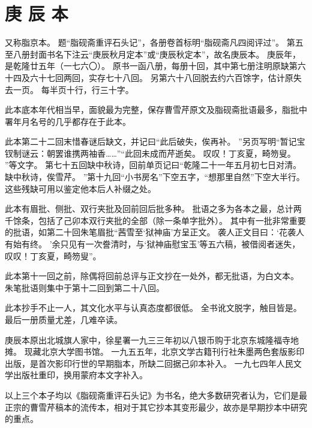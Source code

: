 \section*{庚 辰 本}
又称脂京本。
题“脂砚斋重评石头记”，各册卷首标明“脂砚斋凡四阅评过”。
第五至八册封面书名下注云“庚辰秋月定本”或“庚辰秋定本”，故名庚辰本。
庚辰年，是乾隆廿五年（一七六〇）。
原书一函八册，每册十回，其中第七册注明原缺第六十四及六十七回两回，实存七十八回。
另第六十八回脱去约六百馀字，估计原失去一页。
每半页十行，行三十字。
\par
此本底本年代相当早，面貌最为完整，保存曹雪芹原文及脂砚斋批语最多，脂批中署年月名号的几乎都存在于此本。
\par
此本第二十二回末惜春谜后缺文，并记曰“此后破失，俟再补。
”另页写明“暂记宝钗制谜云：朝罢谁携两袖香……”“此回未成而芹逝矣。
叹叹！丁亥夏，畸笏叟。
”等文字。
第七十五回缺中秋诗，回前单页记曰“乾隆二十一年五月初七日对清。
缺中秋诗，俟雪芹。
”第十九回“小书房名”下空五字，“想那里自然”下空大半行。
这些残缺可用以鉴定他本后人补缀之处。
\par
此本有眉批、侧批、双行夹批及回前回后批多种。
批语之多为各本之最，总计两千馀条，包括了己卯本双行夹批的全部（除一条单字批外）。
其中有一批非常重要的批语，如第二十回朱笔眉批“茜雪至‘狱神庙’方呈正文。
袭人正文目曰：‘花袭人有始有终。
’余只见有一次誊清时，与‘狱神庙慰宝玉’等五六稿，被借阅者迷失，叹叹！丁亥夏，畸笏叟”。
\par
此本第十一回之前，除偶将回前总评与正文抄在一处外，都无批语，为白文本。
朱笔批语则集中于第十二回到第二十八回。
\par
此本抄手不止一人，其文化水平与认真态度都很低。
全书讹文脱字，触目皆是。
最后一册质量尤差，几难卒读。
\par
庚辰本原出北城旗人家中，徐星署一九三三年初以八银币购于北京东城隆福寺地摊。
现藏北京大学图书馆。
一九五五年，北京文学古籍刊行社朱墨两色套版影印出版，是首次影印行世的早期脂本，所缺二回据己卯本补入。
一九七四年人民文学出版社重印，换用蒙府本文字补入。
\par
以上三个本子均以《脂砚斋重评石头记》为书名，绝大多数研究者认为，它们是最正宗的曹雪芹稿本的流传本，相对于其它抄本其变形最少，故亦是早期抄本中研究的重点。
\par
